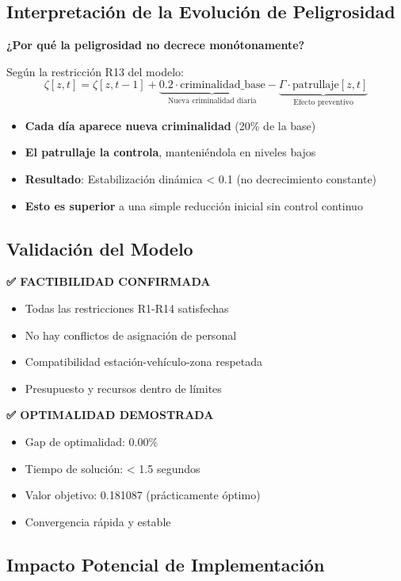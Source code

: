 \subsection{Interpretación de la Evolución de Peligrosidad}

\textbf{¿Por qué la peligrosidad no decrece monótonamente?}

Según la restricción R13 del modelo:
$$\zeta[z,t] = \zeta[z,t-1] + \underbrace{0.2 \cdot \text{criminalidad\_base}}_{\text{Nueva criminalidad diaria}} - \underbrace{\Gamma \cdot \text{patrullaje}[z,t]}_{\text{Efecto preventivo}}$$

\begin{itemize}
    \item \textbf{Cada día aparece nueva criminalidad} (20\% de la base)
    \item \textbf{El patrullaje la controla}, manteniéndola en niveles bajos
    \item \textbf{Resultado}: Estabilización dinámica < 0.1 (no decrecimiento constante)
    \item \textbf{Esto es superior} a una simple reducción inicial sin control continuo
\end{itemize}

\subsection{Validación del Modelo}

\textbf{✅ FACTIBILIDAD CONFIRMADA}
\begin{itemize}
    \item Todas las restricciones R1-R14 satisfechas
    \item No hay conflictos de asignación de personal
    \item Compatibilidad estación-vehículo-zona respetada
    \item Presupuesto y recursos dentro de límites
\end{itemize}

\textbf{✅ OPTIMALIDAD DEMOSTRADA}
\begin{itemize}
    \item Gap de optimalidad: 0.00\%
    \item Tiempo de solución: < 1.5 segundos
    \item Valor objetivo: 0.181087 (prácticamente óptimo)
    \item Convergencia rápida y estable
\end{itemize}

\subsection{Impacto Potencial de Implementación}

